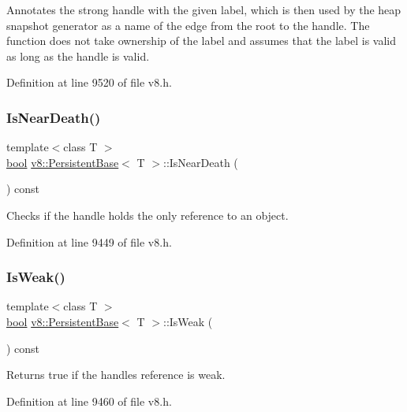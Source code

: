 Annotates the strong handle with the given label, which is then used by the heap snapshot generator as a name of the edge from the root to the handle. The function does not take ownership of the label and assumes that the label is valid as long as the handle is valid. 

Definition at line 9520 of file v8.\+h.

\mbox{\label{classv8_1_1PersistentBase_a6587b66b7d4c0397129c51d0507b4094}} 
\subsubsection{\texorpdfstring{Is\+Near\+Death()}{IsNearDeath()}}
{\footnotesize\ttfamily template$<$class T $>$ \\
\mbox{\hyperlink{classbool}{bool}} \mbox{\hyperlink{classv8_1_1PersistentBase}{v8\+::\+Persistent\+Base}}$<$ T $>$\+::Is\+Near\+Death (\begin{DoxyParamCaption}{ }\end{DoxyParamCaption}) const}

Checks if the handle holds the only reference to an object. 

Definition at line 9449 of file v8.\+h.

\mbox{\label{classv8_1_1PersistentBase_a479c7b146da083aa608e133a7dec79f9}} 
\subsubsection{\texorpdfstring{Is\+Weak()}{IsWeak()}}
{\footnotesize\ttfamily template$<$class T $>$ \\
\mbox{\hyperlink{classbool}{bool}} \mbox{\hyperlink{classv8_1_1PersistentBase}{v8\+::\+Persistent\+Base}}$<$ T $>$\+::Is\+Weak (\begin{DoxyParamCaption}{ }\end{DoxyParamCaption}) const}

Returns true if the handle\textquotesingle{}s reference is weak. 

Definition at line 9460 of file v8.\+h.

